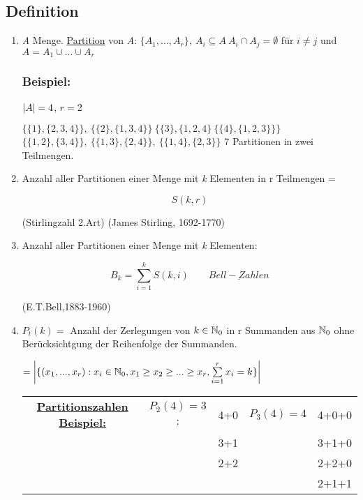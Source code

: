 \subsection{Definition}
\begin{enumerate}
	\item \textit{A} Menge. \underline{Partition} von \textit{A}: $\{ A_1,...,A_r \},~ A_i \subseteq A~ A_i\cap A_j = \emptyset$ für $i\neq j$ und $A = A_1 \cup ... \cup A_r$ 
	\subsubsection*{Beispiel:}
	$\left|A\right|= 4$, $r=2$
	
	$\{\{1\}, \{2,3,4\}\},~ \{\{2\}, \{1,3,4\}\}~ \{\{3\}, \{1,2,4\}~ \{\{4\}, \{1,2,3\}\}\}$
	$\{\{1,2\}, \{3,4\}\},~\{\{1,3\}, \{2,4\}\},~\{\{1,4\}, \{2,3\}\}$ 7 Partitionen in zwei Teilmengen.
	
	\item Anzahl aller Partitionen einer Menge mit \textit{k} Elementen in r Teilmengen = 
	
	$$S(k,r)$$
	\begin{center}
	(Stirlingzahl 2.Art) \qquad \qquad  (James Stirling, 1692-1770)
	\end{center}
	
	\item Anzahl aller Partitionen einer Menge mit \textit{k} Elementen:
	
	$$ B_k = \sum_{i=1}^{k} S(k,i) \qquad \underline{Bell-Zahlen}$$
	\begin{center}
		(E.T.Bell,1883-1960)
	\end{center}
	
	\item $P_t(k) = $ Anzahl der Zerlegungen von $k\in \operatorname{\mathbb{N}}_0$ in r Summanden aus $\operatorname{\mathbb{N}}_0$ ohne Berücksichtgung der Reihenfolge der Summanden.
	
	$=\abs{\{(x_1,...,x_r): x_i \in \N_0, x_1 \geq x_2 \geq ... \geq x_r, \sum_{i=1}^{r} x_i=k\}} $
	
	\begin{tabular}{c c c c c}
	\underline{\textbf{Partitionszahlen Beispiel:}}	&	$P_2(4)=3$:& 4+0 & $P_3(4)=4$	& 4+0+0 \\
												 	&  			& 3+1    &				& 3+1+0 \\
													&   		& 2+2 	 & 				& 2+2+0 \\ 
													& 			&		 &				& 2+1+1 \\
	\end{tabular}


\end{enumerate}

